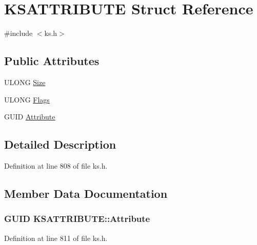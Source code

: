 \hypertarget{struct_k_s_a_t_t_r_i_b_u_t_e}{}\section{K\+S\+A\+T\+T\+R\+I\+B\+U\+TE Struct Reference}
\label{struct_k_s_a_t_t_r_i_b_u_t_e}


{\ttfamily \#include $<$ks.\+h$>$}

\subsection*{Public Attributes}
\begin{DoxyCompactItemize}
\item 
U\+L\+O\+NG \hyperlink{struct_k_s_a_t_t_r_i_b_u_t_e_a5ad1665b8d8b08a7ad8bc621e44d3460}{Size}
\item 
U\+L\+O\+NG \hyperlink{struct_k_s_a_t_t_r_i_b_u_t_e_a3db8e84ca1fa7ce31f2281dd0650d6f2}{Flags}
\item 
G\+U\+ID \hyperlink{struct_k_s_a_t_t_r_i_b_u_t_e_a7e42d726e33407d068a4dc74dc840ba4}{Attribute}
\end{DoxyCompactItemize}


\subsection{Detailed Description}


Definition at line 808 of file ks.\+h.



\subsection{Member Data Documentation}
\subsubsection[{\texorpdfstring{Attribute}{Attribute}}]{\setlength{\rightskip}{0pt plus 5cm}G\+U\+ID K\+S\+A\+T\+T\+R\+I\+B\+U\+T\+E\+::\+Attribute}\hypertarget{struct_k_s_a_t_t_r_i_b_u_t_e_a7e42d726e33407d068a4dc74dc840ba4}{}\label{struct_k_s_a_t_t_r_i_b_u_t_e_a7e42d726e33407d068a4dc74dc840ba4}


Definition at line 811 of file ks.\+h.

